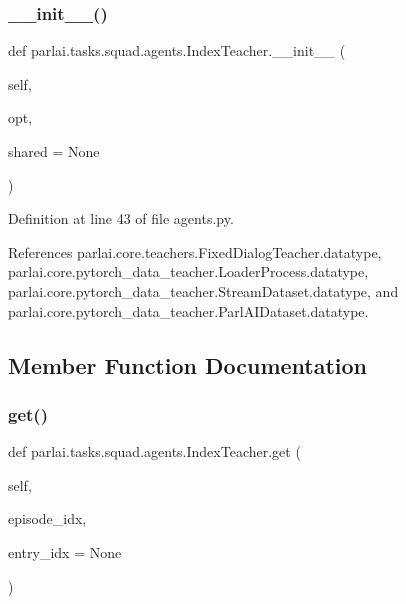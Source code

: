 \subsubsection{\texorpdfstring{\+\_\+\+\_\+init\+\_\+\+\_\+()}{\_\_init\_\_()}}
{\footnotesize\ttfamily def parlai.\+tasks.\+squad.\+agents.\+Index\+Teacher.\+\_\+\+\_\+init\+\_\+\+\_\+ (\begin{DoxyParamCaption}\item[{}]{self,  }\item[{}]{opt,  }\item[{}]{shared = {\ttfamily None} }\end{DoxyParamCaption})}



Definition at line 43 of file agents.\+py.



References parlai.\+core.\+teachers.\+Fixed\+Dialog\+Teacher.\+datatype, parlai.\+core.\+pytorch\+\_\+data\+\_\+teacher.\+Loader\+Process.\+datatype, parlai.\+core.\+pytorch\+\_\+data\+\_\+teacher.\+Stream\+Dataset.\+datatype, and parlai.\+core.\+pytorch\+\_\+data\+\_\+teacher.\+Parl\+A\+I\+Dataset.\+datatype.



\subsection{Member Function Documentation}
\mbox{\label{classparlai_1_1tasks_1_1squad_1_1agents_1_1IndexTeacher_a44b2ee4a74283e8fe0a5b92749ed93d8}} 
\subsubsection{\texorpdfstring{get()}{get()}}
{\footnotesize\ttfamily def parlai.\+tasks.\+squad.\+agents.\+Index\+Teacher.\+get (\begin{DoxyParamCaption}\item[{}]{self,  }\item[{}]{episode\+\_\+idx,  }\item[{}]{entry\+\_\+idx = {\ttfamily None} }\end{DoxyParamCaption})}




